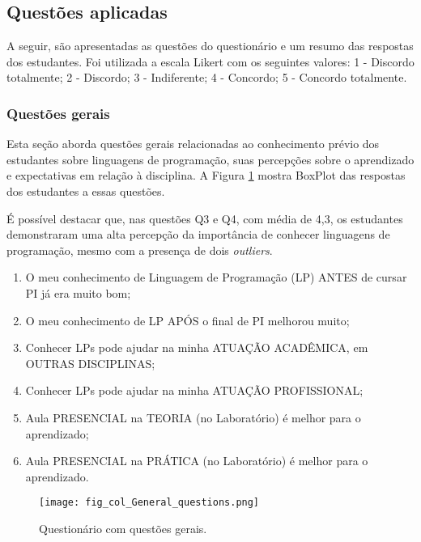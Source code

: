 \subsection{Questões aplicadas}

A seguir, são apresentadas as questões do questionário e um resumo das respostas dos estudantes. Foi utilizada a escala Likert com os seguintes valores: 1 - Discordo totalmente; 2 - Discordo; 3 - Indiferente; 4 - Concordo; 5 - Concordo totalmente.

\subsubsection{Questões gerais}

Esta seção aborda questões gerais relacionadas ao conhecimento prévio dos estudantes sobre linguagens de programação, suas percepções sobre o aprendizado e expectativas em relação à disciplina. A Figura \ref{fig:fig_col_General_questions} mostra BoxPlot \cite{tukey1977box} das respostas dos estudantes a essas questões.

É possível destacar que, nas questões Q3 e Q4, com média de 4,3, os estudantes demonstraram uma alta percepção da importância de conhecer linguagens de programação, mesmo com a presença de dois \textit{outliers}.

\begin{enumerate}[label=\textbf{Q\arabic*.}, itemsep=0pt, parsep=0pt, topsep=0pt, leftmargin=*, before=\ttfamily, after=\normalfont]
    \fontsize{9}{11}\selectfont
    \item O meu conhecimento de Linguagem de Programação (LP) ANTES de cursar PI já era muito bom;
    \item O meu conhecimento de LP APÓS o final de PI melhorou muito;
    \item Conhecer LPs pode ajudar na minha ATUAÇÃO ACADÊMICA, em OUTRAS DISCIPLINAS;
    \item Conhecer LPs pode ajudar na minha ATUAÇÃO PROFISSIONAL;
    \item Aula PRESENCIAL na TEORIA (no Laboratório) é melhor para o aprendizado;
    \item Aula PRESENCIAL na PRÁTICA (no Laboratório) é melhor para o aprendizado.
\end{enumerate}

\begin{figure}[!ht]
    \centering
    \texttt{[image: fig\_col\_General\_questions.png]}
     \caption{Questionário com questões gerais.}
  \label{fig:fig_col_General_questions}
\end{figure}

